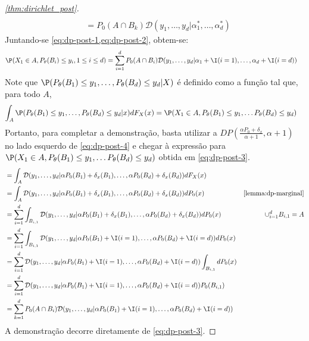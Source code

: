 \begin{proof}[\cref{thm:dirichlet_post}]
\begin{align}
  \nonumber \\
  &= P_0(A \cap B_k)
  \mathcal{D}(y_1,\ldots,y_{d}|\alpha^*_1,\ldots,\alpha^*_d)
 \end{align}
 Juntando-se \cref{eq:dp-post-1,eq:dp-post-2},
 obtem-se:
 \begin{align}
  \label{eq:dp-post-3}
  \P(X_1 \in A, P_{\theta}(B_{i}) \leq y_{i}, 1 \leq i \leq d)
  &= \sum_{i=1}^d P_0(A \cap B_i)
  \mathcal{D}(y_1,\ldots,y_{d}|\alpha_1+\I(i=1),
  \ldots,\alpha_d+\I(i=d))
 \end{align}
 Note que $\P(P_{\theta}(B_{1}) \leq y_1,
 \ldots,P_{\theta}(B_{d}) \leq y_d|X)$
 é definido como a função tal que, para todo $A$,
 \begin{align}
  \label{eq:dp-post-4}
  \int_{A} \P(P_{\theta}(B_{1}) \leq y_1,\ldots,P_{\theta}(B_{d}) \leq y_d|x)
  dF_{X}(x)
  &= \P(X_1 \in A, P_{\theta}(B_{1}) \leq y_1, 
  \ldots P_{\theta}(B_{d}) \leq y_d)
 \end{align}
 Portanto, para completar a demonstração,
 basta utilizar a
 $DP\left(
 \frac{\alpha P_0 + \delta_{x}}
 {\alpha+1}, \alpha+1\right)$
 no lado esquerdo de \cref{eq:dp-post-4} e
 chegar à expressão para
 $\P(X_1 \in A, P_{\theta}(B_{1}) \leq y_1, 
  \ldots P_{\theta}(B_{d}) \leq y_d)$ obtida
 em \cref{eq:dp-post-3}.
 \begin{align*}
  &= \int_{A} \mathcal{D}(y_1,\ldots,y_d|
  \alpha P_0(B_1)+\delta_x(B_1),
  \ldots, \alpha P_0(B_d)+\delta_x(B_d)) dF_{X}(x) \\
  &= \int_{A} \mathcal{D}(y_1,\ldots,y_d|
  \alpha P_0(B_1)+\delta_x(B_1),
  \ldots, \alpha P_0(B_d)+\delta_x(B_d)) dP_0(x)
  & \text{\cref{lemma:dp-marginal}} \\
  &= \sum_{i=1}^d \int_{B_{i,1}}
  \mathcal{D}(y_1,\ldots,y_d|
  \alpha P_0(B_1)+\delta_x(B_1),
  \ldots, \alpha P_0(B_d)+\delta_x(B_d)) dP_0(x)
  & \cup_{i=1}^d B_{i,1} = A \\
  &= \sum_{i=1}^d \int_{B_{i,1}}
  \mathcal{D}(y_1,\ldots,y_d|
  \alpha P_0(B_1) + \I(i=1),
  \ldots, \alpha P_0(B_d)+ \I(i=d)) dP_0(x) \\
  &= \sum_{i=1}^d \mathcal{D}(y_1,\ldots,y_d|
  \alpha P_0(B_1) + \I(i=1),
  \ldots, \alpha P_0(B_d)+ \I(i=d))
  \int_{B_{i,1}} dP_0(x) \\
  &= \sum_{i=1}^d \mathcal{D}(y_1,\ldots,y_d|
  \alpha P_0(B_1) + \I(i=1),
  \ldots, \alpha P_0(B_d)+ \I(i=d)) P_0(B_{i,1}) \\
  &= \sum_{k=1}^d P_0(A \cap B_{i})
  \mathcal{D}(y_1,\ldots,y_d|
  \alpha P_0(B_1) + \I(i=1),
  \ldots, \alpha P_0(B_d)+ \I(i=d)) 
 \end{align*}
 A demonstração decorre diretamente de
 \cref{eq:dp-post-3}.
\end{proof}


